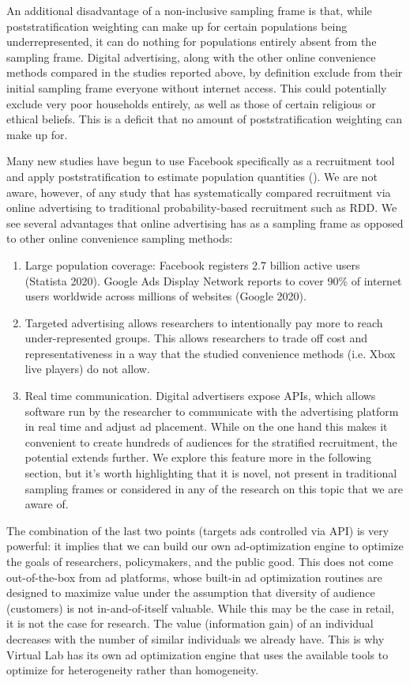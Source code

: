 \message{ !name(survey-sampling-with-ads.tex)}\documentclass[a4paper,12pt]{article}
\theoremstyle{proposition}
\begin{document}
An additional disadvantage of a non-inclusive sampling frame is that, while poststratification weighting can make up for certain populations being underrepresented, it can do nothing for populations entirely absent from the sampling frame. Digital advertising, along with the other online convenience methods compared in the studies reported above, by definition exclude from their initial sampling frame everyone without internet access. This could potentially exclude very poor households entirely, as well as those of certain religious or ethical beliefs. This is a deficit that no amount of poststratification weighting can make up for.

Many new studies have begun to use Facebook specifically as a recruitment tool and apply poststratification to estimate population quantities (\cite{Zagheni2017,Perrotta2020}). We are not aware, however, of any study that has systematically compared recruitment via online advertising to traditional probability-based recruitment such as RDD. We see several advantages that online advertising has as a sampling frame as opposed to other online convenience sampling methods:

\begin{enumerate}
\item Large population coverage: Facebook registers 2.7 billion active users (Statista 2020). Google Ads Display Network reports to cover 90\% of internet users worldwide across millions of websites (Google 2020).

\item Targeted advertising allows researchers to intentionally pay more to reach under-represented groups. This allows researchers to trade off cost and representativeness in a way that the studied convenience methods (i.e. Xbox live players) do not allow.

\item Real time communication. Digital advertisers expose APIs, which allows software run by the researcher to communicate with the advertising platform in real time and adjust ad placement. While on the one hand this makes it convenient to create hundreds of audiences for the stratified recruitment, the potential extends further. We explore this feature more in the following section, but it’s worth highlighting that it is novel, not present in traditional sampling frames or considered in any of the research on this topic that we are aware of.
\end{enumerate}


The combination of the last two points (targets ads controlled via API) is very powerful: it implies that we can build our own ad-optimization engine to optimize the goals of researchers, policymakers, and the public good. This does not come out-of-the-box from ad platforms, whose built-in ad optimization routines are designed to maximize value under the assumption that diversity of audience (customers) is not in-and-of-itself valuable. While this may be the case in retail, it is not the case for research. The value (information gain) of an individual decreases with the number of similar individuals we already have. This is why Virtual Lab has its own ad optimization engine that uses the available tools to optimize for heterogeneity rather than homogeneity.
\end{document}
